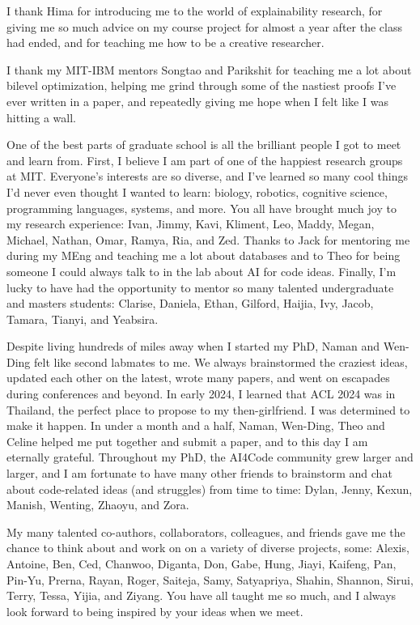 I thank Hima for introducing me to the world of explainability research, for giving me so much advice on my course project for almost a year after the class had ended, and for teaching me how to be a creative researcher.

I thank my MIT-IBM mentors Songtao and Parikshit for teaching me a lot about bilevel optimization, helping me grind through some of the nastiest proofs I've ever written in a paper, and repeatedly giving me hope when I felt like I was hitting a wall.

One of the best parts of graduate school is all the brilliant people I got to meet and learn from. First, I believe I am part of one of the happiest research groups at MIT. Everyone's interests are so diverse, and I've learned so many cool things I'd never even thought I wanted to learn: biology, robotics, cognitive science, programming languages, systems, and more. You all have brought much joy to my research experience: Ivan, Jimmy, Kavi, Kliment, Leo, Maddy, Megan, Michael, Nathan, Omar, Ramya, Ria, and Zed. Thanks to Jack for mentoring me during my MEng and teaching me a lot about databases and to Theo for being someone I could always talk to in the lab about AI for code ideas. Finally, I'm lucky to have had the opportunity to mentor so many talented undergraduate and masters students: Clarise, Daniela, Ethan, Gilford, Haijia, Ivy, Jacob, Tamara, Tianyi, and Yeabsira.

Despite living hundreds of miles away when I started my PhD, Naman and Wen-Ding felt like second labmates to me. We always brainstormed the craziest ideas, updated each other on the latest, wrote many papers, and went on escapades during conferences and beyond. In early 2024, I learned that ACL 2024 was in Thailand, the perfect place to propose to my then-girlfriend. I was determined to make it happen. In under a month and a half, Naman, Wen-Ding, Theo and Celine helped me put together and submit a paper, and to this day I am eternally grateful. Throughout my PhD, the AI4Code community grew larger and larger, and I am fortunate to have many other friends to brainstorm and chat about code-related ideas (and struggles) from time to time: Dylan, Jenny, Kexun, Manish, Wenting, Zhaoyu, and Zora.

My many talented co-authors, collaborators, colleagues, and friends gave me the chance to think about and work on on a variety of diverse projects, some: Alexis, Antoine, Ben, Ced, Chanwoo, Diganta, Don, Gabe, Hung, Jiayi, Kaifeng, Pan, Pin-Yu, Prerna, Rayan, Roger, Saiteja, Samy, Satyapriya, Shahin, Shannon, Sirui, Terry, Tessa, Yijia, and Ziyang. You have all taught me so much, and I always look forward to being inspired by your ideas when we meet.

